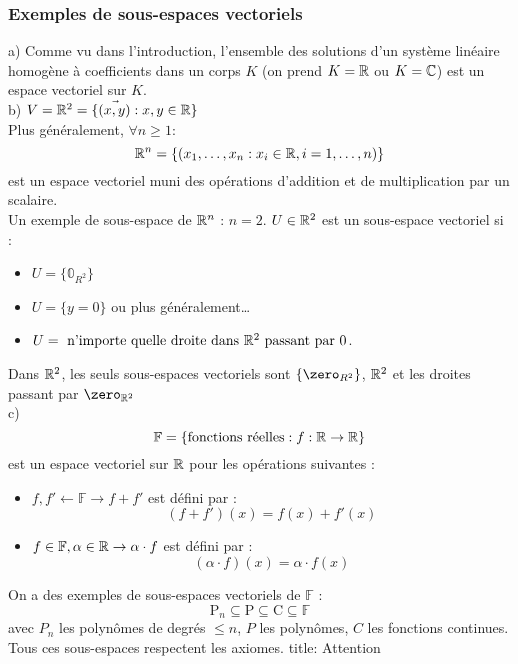 \documentclass[12pt]{article}
\begin{document}
\subsubsection{Exemples de sous-espaces vectoriels}
a) Comme vu dans l'introduction, l'ensemble des solutions d'un système linéaire homogène à 
coefficients dans un corps $K$ (on prend $K = \mathbb{R}$ ou $K = \mathbb{C}$) est un espace vectoriel sur $K$.
\\
b) $V = \mathbb{R}^2 = \{\vec{(x, y)} : x, y \in \mathbb{R}\}$
\\
Plus généralement, $\forall n \geq 1$:
$$
\mathbb{R}^n =  \{(x_1, \dots, x_n : x_i \in \mathbb{R}, i = 1, \dots, n)\}
$$
est un espace vectoriel muni des opérations d'addition et de multiplication par un scalaire.
\\
Un exemple de sous-espace de $\mathbb{R}^n$ : $n=2$. $U \in \mathbb{R}^2$ est un sous-espace vectoriel si :
\begin{itemize}
    \item $U=\{\mathbb 0_{R^2}\}$
    \item $U=\{y=0\}$ ou plus généralement\dots
    \item $U= \text{ n'importe quelle droite dans } \mathbb{R}^2 \text{ passant par } 0$. 
\end{itemize}

Dans $\mathbb{R}^2$, les seuls sous-espaces vectoriels sont $\{\zero_{R^2}\}$, $\mathbb{R}^2$ et les droites passant par $\zero_{\R^2}$
\\
c) $$\mathbb F = \{\text{fonctions réelles} : f : \mathbb{R} \rightarrow \mathbb{R} \}$$ est un espace vectoriel sur $\mathbb{R}$ pour les opérations suivantes :
\begin{itemize}
    \item $f, f' \leftarrow \mathbb F \rightarrow f + f'$ est défini par :
    $$(f+f')(x)=f(x)+f'(x)$$
    \item $f \in \mathbb F, \alpha \in \mathbb{R} \rightarrow \alpha \cdot f$ est défini par :$$(\alpha \cdot f)(x) = \alpha \cdot f(x)$$
\end{itemize} 
On a des exemples de sous-espaces vectoriels de $\mathbb F$ :
$$\mathrm P_n \subseteq\mathrm P \subseteq \mathrm C \subseteq \mathbb F $$
avec $P_n$ les polynômes de degrés $\leq n$, $P$ les polynômes, $C$ les fonctions continues.
Tous ces sous-espaces respectent les axiomes.
title: Attention
\end{document}
